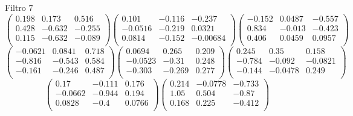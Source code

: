 Filtro 7
{ \small
\[
\begin{pmatrix}
  0.198 & 0.173 & 0.516 \\
  0.428 & -0.632 & -0.255 \\
  0.115 & -0.632 & -0.089 \\
\end{pmatrix}
\begin{pmatrix}
  0.101 & -0.116 & -0.237 \\
  -0.0516 & -0.219 & 0.0321 \\
  0.0814 & -0.152 & -0.00684 \\
\end{pmatrix}
\begin{pmatrix}
  -0.152 & 0.0487 & -0.557 \\
  0.834 & -0.013 & -0.423 \\
  0.406 & 0.0459 & 0.0957 \\
\end{pmatrix}
\]
\[
\begin{pmatrix}
  -0.0621 & 0.0841 & 0.718 \\
  -0.816 & -0.543 & 0.584 \\
  -0.161 & -0.246 & 0.487 \\
\end{pmatrix}
\begin{pmatrix}
  0.0694 & 0.265 & 0.209 \\
  -0.0523 & -0.31 & 0.248 \\
  -0.303 & -0.269 & 0.277 \\
\end{pmatrix}
\begin{pmatrix}
  0.245 & 0.35 & 0.158 \\
  -0.784 & -0.092 & -0.0821 \\
  -0.144 & -0.0478 & 0.249 \\
\end{pmatrix}
\]
\[
\begin{pmatrix}
  0.17 & -0.111 & 0.176 \\
  -0.0662 & -0.944 & 0.194 \\
  0.0828 & -0.4 & 0.0766 \\
\end{pmatrix}
\begin{pmatrix}
  0.214 & -0.0778 & -0.733 \\
  1.05 & 0.504 & -0.87 \\
  0.168 & 0.225 & -0.412 \\
\end{pmatrix}
\]
}

